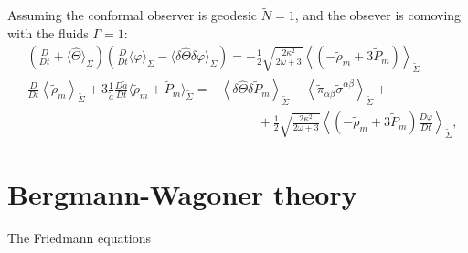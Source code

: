 Assuming the conformal observer is geodesic $\tilde{N}=1$, and the obsever is comoving with the fluids $\Gamma=1$:
\begin{align}
    &\left(\frac{D}{Dt}+\langle\hat{\Theta}\rangle_{\tilde{\Sigma}}\right)\left(\frac{D}{Dt}\langle\varphi\rangle_{\tilde{\Sigma}}-\langle\delta\hat{\Theta}\delta\varphi\rangle_{\tilde{\Sigma}}\right)=-\frac{1}{2}\sqrt{\frac{2\kappa^2}{2\omega+3}}\left\langle(-\tilde{\rho}_m+3\tilde{P}_m)\right\rangle_{\tilde{\Sigma}}\\
    &\frac{D}{Dt}\left\langle \tilde{\rho}_m\right\rangle_{\tilde{\Sigma}}+3\frac{1}{\tilde{a}}\frac{D\tilde{a}}{Dt}\langle \tilde{\rho}_m+\tilde{P}_m\rangle_{\tilde{\Sigma}}=-\left\langle\delta\hat{\Theta}\delta\tilde{P}_m\right\rangle_{\tilde{\Sigma}}-\left\langle\tilde{\pi}_{\alpha\beta}\tilde{\sigma}^{\alpha\beta}\right\rangle_{\tilde{\Sigma}}+\nonumber\\
    &\qquad\qquad\qquad\qquad\qquad\qquad\qquad\qquad\qquad+\frac{1}{2}\sqrt{\frac{2\kappa^2}{2\omega+3}}\left\langle (-\tilde{\rho}_m+3\tilde{P}_m)\frac{D\varphi}{Dt}\right\rangle_{\tilde{\Sigma}},
\end{align}



\section{Bergmann-Wagoner theory}

The Friedmann equations 

